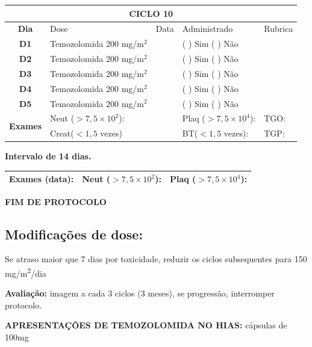 \documentclass[11pt,a4paper,oldfontcommands]{memoir}
\begin{document}
\begin{center}
\begin{longtable}{p{1cm}p{4cm}|p{1cm}|p{4.6cm}|p{3cm}}
	\hline
	\multicolumn{5}{c}{\textbf{CICLO 10}}\\
\hline
    \multicolumn{1}{c|}{\multirow{1}{*}{\textbf{Dia}}}&{Dose}&{Data}&{Administrado}&{Rubrica} \\
    \hline
    \multicolumn{1}{c|}{\multirow{1}{*}{\textbf{D1}}}&{Temozolomida \(200\) mg/m\(^2\)}&&{(  ) Sim (  ) Não}&\\
    \multicolumn{1}{c|}{\multirow{1}{*}{\textbf{D2}}}&{Temozolomida \(200\) mg/m\(^2\)}&&{(  ) Sim (  ) Não}&\\
    \multicolumn{1}{c|}{\multirow{1}{*}{\textbf{D3}}}&{Temozolomida \(200\) mg/m\(^2\)}&&{(  ) Sim (  ) Não}&\\
    \multicolumn{1}{c|}{\multirow{1}{*}{\textbf{D4}}}&{Temozolomida \(200\) mg/m\(^2\)}&&{(  ) Sim (  ) Não}&\\
    \multicolumn{1}{c|}{\multirow{1}{*}{\textbf{D5}}}&{Temozolomida \(200\) mg/m\(^2\)}&&{(  ) Sim (  ) Não}&\\
    \hline
    \multicolumn{1}{c|}{\multirow{2}{*}{\textbf{Exames}}}&\multicolumn{2}{l|}{Neut (\(>7,5\times10^2\)):}&{Plaq (\(>7,5\times10^4\)):}&{TGO:}\\
    \cline{2-5}
    \multicolumn{1}{c|}{\multirow{2}{*}{{}}}&\multicolumn{2}{l|}{Creat(\(<1,5\) vezes)}&{BT(\(<1,5\) vezes):}&{TGP:}
    \\
    \hline
\end{longtable}
\textbf{Intervalo de 14 dias.}
\begin{longtable}{p{5cm}|p{5cm}|p{4.5cm}}
    \hline
    \textbf{Exames (data):}&{Neut (\(>7,5\times10^2\)):}&{Plaq (\(>7,5\times10^4\)):}
    \\
    \hline
\end{longtable}

\textbf{FIM DE PROTOCOLO}

\end{center}
\subsection{Modificações de dose:}
Se atraso maior que 7 dias por toxicidade, reduzir os ciclos subsequentes para 150 mg/m\textsuperscript{2}/dia

\textbf{Avaliação:} imagem a cada 3 ciclos (3 meses), se progressão, interromper protocolo.

\textbf{APRESENTAÇÕES DE TEMOZOLOMIDA NO HIAS:} cápsulas de 100mg
\end{document}

